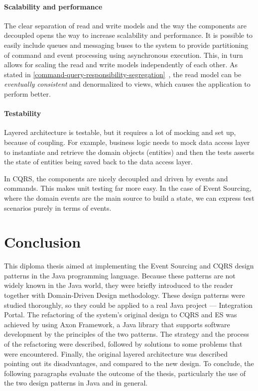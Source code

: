 \documentclass{book}
\begin{document}
\paragraph{Scalability and
performance}\label{scalability-and-performance}

The clear separation of read and write models and the way the components
are decoupled opens the way to increase scalability and performance. It
is possible to easily include queues and messaging buses to the system
to provide partitioning of command and event processing using
asynchronous execution. This, in turn allows for scaling the read and
write models independently of each other. As stated in
\ref{command-query-responsibility-segregation}~, the read model can
be \emph{eventually consistent} and denormalized to views, which causes
the application to perform better.

\paragraph{Testability}\label{testability}

Layered architecture is testable, but it requires a lot of mocking and
set up, because of coupling. For example, business logic needs to mock
data access layer to instantiate and retrieve the domain objects
(entities) and then the tests asserts the state of entities being saved
back to the data access layer.

In CQRS, the components are nicely decoupled and driven by events and
commands. This makes unit testing far more easy. In the case of Event
Sourcing, where the domain events are the main source to build a state,
we can express test scenarios purely in terms of events.


\section{Conclusion}\label{conclusion}

This diploma thesis aimed at implementing the Event Sourcing and CQRS
design patterns in the Java programming language. Because these patterns
are not widely known in the Java world, they were briefly introduced to
the reader together with Domain-Driven Design methodology. These design
patterns were studied thoroughly, so they could be applied to a real
Java project --- Integration Portal. The refactoring of the system's
original design to CQRS and ES was achieved by using Axon Framework, a
Java library that supports software development by the principles of the
two patterns. The strategy and the process of the refactoring were
described, followed by solutions to some problems that were encountered.
Finally, the original layered architecture was described pointing out
its disadvantages, and compared to the new design. To conclude, the
following paragraphs evaluate the outcome of the thesis, particularly
the use of the two design patterns in Java and in general.
\end{document}
